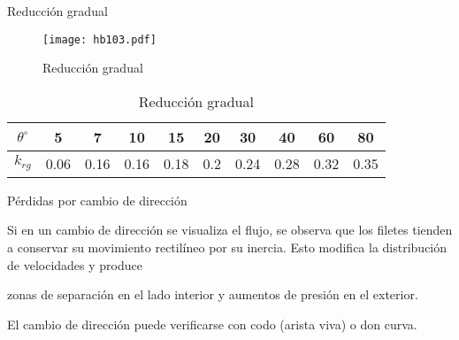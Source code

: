 Reducción gradual
\begin{figure}[h!]
\centering
  \texttt{[image: hb103.pdf]}
  \caption{Reducción gradual}
  \label{hb103}
\end{figure}
\begin{table}[h!]
    \centering
    \begin{tabular}{@{}cccccccccc@{}}
    \toprule
    $\theta^{\circ}$ & 5    & 7    & 10   & 15   & 20  & 30   & 40   & 60   & 80   \\ \midrule
    $k_{rg}$         & 0.06 & 0.16 & 0.16 & 0.18 & 0.2 & 0.24 & 0.28 & 0.32 & 0.35 \\ \bottomrule
    \end{tabular}
    \caption{Reducción gradual}
    \label{tabhb16}
    \end{table}

Pérdidas por cambio de dirección

Si en un cambio de dirección se visualiza el flujo, se observa que los filetes tienden a conservar su movimiento rectilíneo por su inercia. Esto modifica la distribución de velocidades y produce

zonas de separación en el lado interior y aumentos de presión en el exterior.

El cambio de dirección puede verificarse con codo (arista viva) o don curva.

